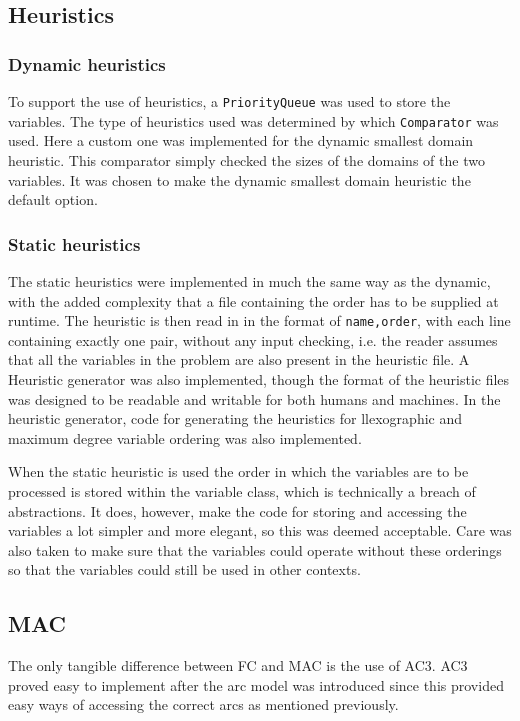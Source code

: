 \documentclass[british]{article}
\newcommand{\code}[1]{\texttt{#1}}
\begin{document}
	\subsection{Heuristics}
	\subsubsection{Dynamic heuristics}
	To support the use of heuristics, a \code{PriorityQueue} was used to store the variables. The type of heuristics used was determined by which \code{Comparator}
	was used. Here a custom one was implemented for the dynamic smallest domain heuristic. This comparator simply checked the sizes of the domains of the two variables. It was chosen to make the dynamic smallest domain heuristic the default option. 
	\subsubsection{Static heuristics} The static heuristics were implemented in much the same way as the dynamic, with the added complexity that a file containing the order has to be supplied at runtime. The heuristic is then read in in the format of \code{name,order}, with each line containing exactly one pair, without any input checking, i.e. the reader assumes that all the variables in the problem are also present in the heuristic file. A Heuristic generator was also implemented, though the format of the heuristic files was designed to be readable and writable for both humans and machines. In the heuristic generator, code for generating the heuristics for llexographic and maximum degree variable ordering was also implemented. 
	
	When the static heuristic is used the order in which the variables are to be processed is stored within the variable class, which is technically a breach of abstractions. It does, however, make the code for storing and accessing the variables a lot simpler and more elegant, so this was deemed acceptable. Care was also taken to make sure that the variables could operate without these orderings so that the variables could still be used in other contexts. 
	
	\subsection{MAC}
	The only tangible difference between FC and MAC is the use of AC3. AC3 proved easy to implement after the arc model was introduced since this provided easy ways of accessing the correct arcs as mentioned previously. 
	
\end{document}
